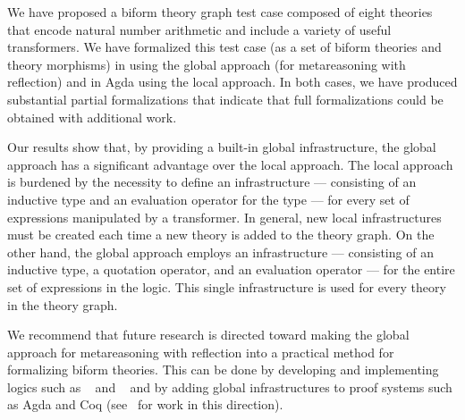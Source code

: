 \documentclass[fleqn]{llncs}
\begin{document}
We have proposed a biform theory graph test case composed of eight
theories that encode natural number arithmetic and include a variety
of useful transformers.  We have formalized this test case (as a set
of biform theories and theory morphisms) in {\churchuqe} using the
global approach (for metareasoning with reflection) and in Agda using
the local approach.  In both cases, we have produced substantial
partial formalizations that indicate that full formalizations could be
obtained with additional work.

Our results show that, by providing a built-in global infrastructure,
the global approach has a significant advantage over the local
approach.  The local approach is burdened by the necessity to define
an infrastructure --- consisting of an inductive type and an
evaluation operator for the type --- for every set of expressions
manipulated by a transformer.  In general, new local infrastructures
must be created each time a new theory is added to the theory graph.
On the other hand, the global approach employs an infrastructure ---
consisting of an inductive type, a quotation operator, and an
evaluation operator --- for the entire set of expressions in the
logic.  This single infrastructure is used for every theory in the
theory graph.

We recommend that future research is directed toward making the global
approach for metareasoning with reflection into a practical method for
formalizing biform theories.  This can be done by developing and
implementing logics such as {\churchqe}~\cite{FarmerArxiv16,Farmer16}
and {\churchuqe}~\cite{FarmerArxiv17} and by adding global
infrastructures to proof systems such as Agda and Coq
(see~\cite{VanDerWalt12,VanDerWaltSwierstra12} for work in this
direction).



\end{document}
